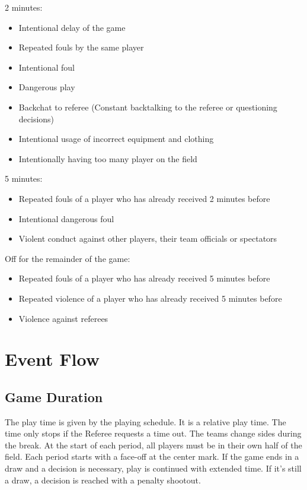 2 minutes:
\begin{itemize}
\item Intentional delay of the game
\item Repeated fouls by the same player
\item Intentional foul
\item Dangerous play
\item Backchat to referee (Constant backtalking to the referee or questioning decisions) 
\item Intentional usage of incorrect equipment and clothing
\item Intentionally having too many player on the field
\end{itemize}
5 minutes:
\begin{itemize}
\item Repeated fouls of a player who has already received 2 minutes before
\item Intentional dangerous foul
\item Violent conduct against other players, their team officials or spectators
\end{itemize}
Off for the remainder of the game:
\begin{itemize}
\item Repeated fouls of a player who has already received 5 minutes before
\item Repeated violence of a player who has already received 5 minutes before
\item Violence against referees
\end{itemize}

\section{Event Flow}

\subsection{Game Duration}

The play time is given by the playing schedule.
It is a relative play time.
The time only stops if the Referee requests a time out.
The teams change sides during the break.
At the start of each period, all players must be in their own half of the field.
Each period starts with a face-off at the center mark.
If the game ends in a draw and a decision is necessary, play is continued with extended time.
If it's still a draw, a decision is reached with a penalty shootout.

